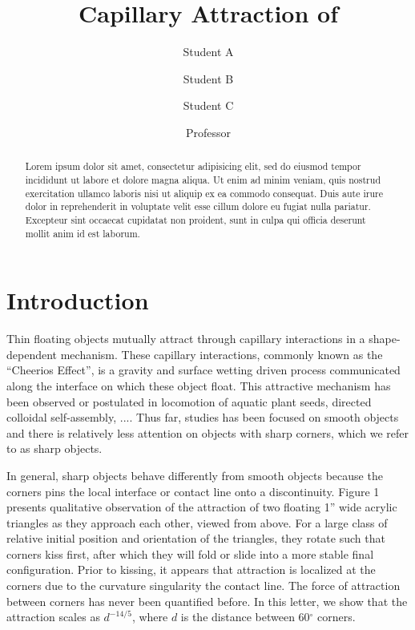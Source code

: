 \documentclass[twocolumn,prl]{revtex4-1}
\begin{document}
\title{Capillary Attraction of }
\author{Student A}
\author{Student B}
\author{Student C}
\author{Professor}

\begin{abstract}
	Lorem ipsum dolor sit amet, consectetur adipisicing elit, sed do eiusmod tempor incididunt ut labore et dolore magna aliqua. Ut enim ad minim veniam, quis nostrud exercitation ullamco laboris nisi ut aliquip ex ea commodo consequat. Duis aute irure dolor in reprehenderit in voluptate velit esse cillum dolore eu fugiat nulla pariatur. Excepteur sint occaecat cupidatat non proident, sunt in culpa qui officia deserunt mollit anim id est laborum.
\end{abstract}

\maketitle

\section{Introduction}
	
	Thin floating objects mutually attract through capillary interactions in a shape-dependent mechanism. These capillary interactions, commonly known as the “Cheerios Effect”, is a gravity and surface wetting driven process communicated along the interface on which these object float.  This attractive mechanism has been observed or postulated in locomotion of aquatic plant seeds\cite{peruzzo2013capillary}, directed colloidal self-assembly\cite{fan2004assembly}, .... Thus far, studies has been focused on smooth objects and there is relatively less attention on objects with sharp corners, which we refer to as sharp objects. 
	
	In general, sharp objects behave differently from smooth objects because the corners pins the local interface or contact line onto a discontinuity. Figure 1 presents qualitative observation of the attraction of two floating 1'' wide acrylic triangles as they approach each other, viewed from above. For a large class of relative initial position and orientation of the triangles, they rotate such that corners kiss first, after which they will fold or slide into a more stable final configuration. Prior to kissing, it appears that attraction is localized at the corners due to the curvature singularity  the contact line. The force of attraction between corners has never been quantified before. In this letter, we show that the attraction scales as $d^{-14/5}$, where $d$ is the distance between 60$^{\circ}$ corners. %
\end{document}
